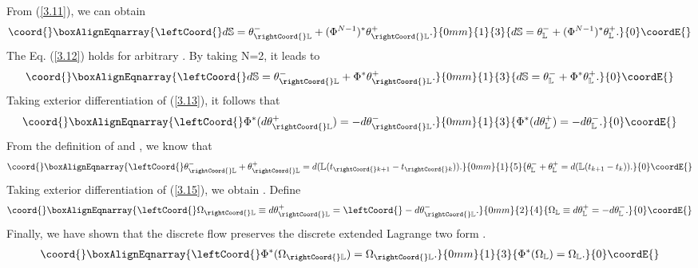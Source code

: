 \documentclass[a4paper,a4paper]{article}
\begin{document}
From (\ref{3.11}), we can obtain
\begin{align}\coord{}\boxAlignEqnarray{
\leftCoord{}d\mathbb{S}=\theta_{\rightCoord{}\mathbb{L}}^{-}+(\Phi^{N-1})^{*}\theta_{\rightCoord{}\mathbb{L}}^{+}.
\label{3.12}
}{0mm}{1}{3}{
d\mathbb{S}=\theta_{\mathbb{L}}^{-}+(\Phi^{N-1})^{*}\theta_{\mathbb{L}}^{+}.
}{0}\coordE{}\end{align}
The Eq. (\ref{3.12}) holds for arbitrary \coordHE{}. By taking N=2, it
leads to
\begin{align}\coord{}\boxAlignEqnarray{
\leftCoord{}d\mathbb{S}=\theta_{\rightCoord{}\mathbb{L}}^{-}+\Phi^{*}\theta_{\rightCoord{}\mathbb{L}}^{+}.
\label{3.13}
}{0mm}{1}{3}{
d\mathbb{S}=\theta_{\mathbb{L}}^{-}+\Phi^{*}\theta_{\mathbb{L}}^{+}.
}{0}\coordE{}\end{align}
Taking exterior differentiation of (\ref{3.13}), it follows
that
\begin{align}\coord{}\boxAlignEqnarray{
  \leftCoord{}\Phi^{*}(d\theta_{\rightCoord{}\mathbb{L}}^{+})=-d\theta_{\rightCoord{}\mathbb{L}}^{-}. \label{3.14}
}{0mm}{1}{3}{
  \Phi^{*}(d\theta_{\mathbb{L}}^{+})=-d\theta_{\mathbb{L}}^{-}. }{0}\coordE{}\end{align}
From the definition of \coordHE{} and \coordHE{}, we
know that
\begin{align}\coord{}\boxAlignEqnarray{
   \leftCoord{}\theta_{\rightCoord{}\mathbb{L}}^{-}+\theta_{\rightCoord{}\mathbb{L}}^{+}=d(\mathbb{L}(t_{\rightCoord{}k+1}-t_{\rightCoord{}k})).\label{3.15}
}{0mm}{1}{5}{
   \theta_{\mathbb{L}}^{-}+\theta_{\mathbb{L}}^{+}=d(\mathbb{L}(t_{k+1}-t_{k})).}{0}\coordE{}\end{align}
Taking exterior differentiation of (\ref{3.15}), we obtain
\coordHE{}.  Define
\begin{align}\coord{}\boxAlignEqnarray{
 \leftCoord{}\Omega_{\rightCoord{}\mathbb{L}}\equiv d\theta_{\rightCoord{}\mathbb{L}}^{+}=
\leftCoord{}-d\theta_{\rightCoord{}\mathbb{L}}^{-}.\label{3.16}
}{0mm}{2}{4}{
 \Omega_{\mathbb{L}}\equiv d\theta_{\mathbb{L}}^{+}=
-d\theta_{\mathbb{L}}^{-}.}{0}\coordE{}\end{align}
Finally, we have shown that the discrete flow \myHighlight{$\Phi$}\coordHE{} preserves the
discrete extended Lagrange two form \coordHE{}.
\begin{align}\coord{}\boxAlignEqnarray{
  \leftCoord{}\Phi^{*}(\Omega_{\rightCoord{}\mathbb{L}})=\Omega_{\rightCoord{}\mathbb{L}}. \label{3.17}
}{0mm}{1}{3}{
  \Phi^{*}(\Omega_{\mathbb{L}})=\Omega_{\mathbb{L}}. }{0}\coordE{}\end{align}
\end{document}
